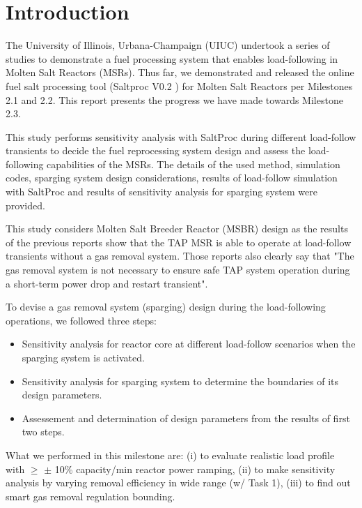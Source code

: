 \section{Introduction}

    The University of Illinois, Urbana-Champaign (UIUC) undertook a series of studies to demonstrate a fuel processing system that enables load-following in Molten Salt Reactors (MSRs). Thus far, we demonstrated and released the online fuel salt processing tool (Saltproc V0.2 \cite{rykhlevskii_saltproc_2018}) for Molten Salt Reactors per Milestones 2.1 and 2.2. This report presents the progress we have made towards Milestone 2.3.

    This study performs sensitivity analysis with SaltProc during different
    load-follow transients to decide the fuel reprocessing system design and
    assess the load-following capabilities of the MSRs. The details of the used
    method, simulation codes, sparging system design considerations,
    results of load-follow simulation with SaltProc and results of sensitivity analysis for sparging system were provided.

    This study considers Molten Salt Breeder Reactor (MSBR) \cite{robertson_conceptual_1971} design as the results of the previous reports \cite{rykhlevskii_milestone_2019} show that the TAP MSR is able to operate at load-follow transients without a gas removal system. Those reports also clearly say that "The gas removal system is not necessary to ensure safe TAP system operation during a short-term power drop and restart transient".

    To devise a gas removal system (sparging) design during the load-following operations, we followed three steps:
    \begin{itemize}
        \item Sensitivity analysis for reactor core at different load-follow scenarios when the sparging system is activated.
        \item Sensitivity analysis for sparging system to determine the boundaries of its design parameters.
        \item Assessement and determination of design parameters from the results of first two steps.
    \end{itemize}

    What we performed in this milestone are: (i) to evaluate realistic load profile with $\geq$ $\pm$ 10\% capacity/min reactor power ramping, (ii) to make sensitivity analysis by varying removal efficiency in wide range (w/ Task 1), (iii) to find out smart gas removal regulation bounding.

